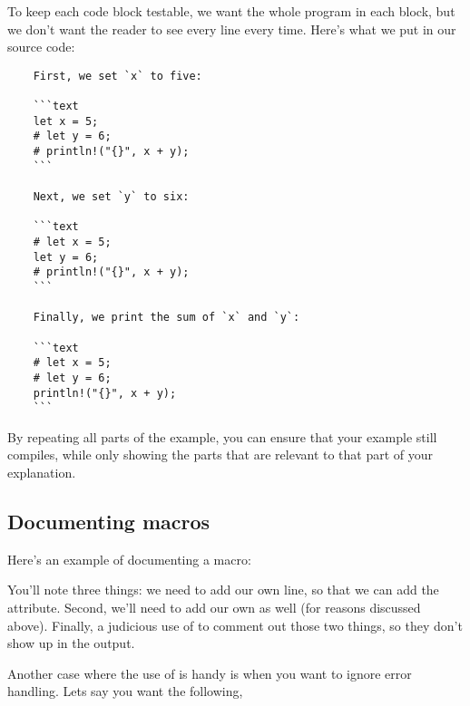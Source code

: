 To keep each code block testable, we want the whole program in each block, but we don't want the reader to see every line every time. 
Here's what we put in our source code:

\begin{verbatim}
    First, we set `x` to five:

    ```text
    let x = 5;
    # let y = 6;
    # println!("{}", x + y);
    ```

    Next, we set `y` to six:

    ```text
    # let x = 5;
    let y = 6;
    # println!("{}", x + y);
    ```

    Finally, we print the sum of `x` and `y`:

    ```text
    # let x = 5;
    # let y = 6;
    println!("{}", x + y);
    ```
\end{verbatim}

By repeating all parts of the example, you can ensure that your example still compiles, while only showing the parts that are relevant 
to that part of your explanation.

\subsection*{Documenting macros}

Here’s an example of documenting a macro:


You’ll note three things: we need to add our own  line, so that we can add the  attribute. 
Second, we’ll need to add our own  as well (for reasons discussed above). Finally, a judicious use of \code{\#} to 
comment out those two things, so they don’t show up in the output.

\blank

Another case where the use of \code{\#} is handy is when you want to ignore error handling. Lets say you want the following,


